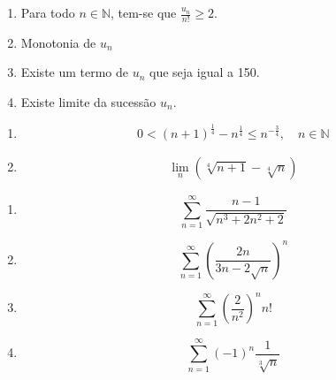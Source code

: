 \documentclass[11pt, a4paper]{article}
\begin{document}
\begin{enumerate}[label=\arabic{section}.\arabic*.]
	\item
		\begin{proposition}
			Para todo $n \in \mathbb{N}$, tem-se que $\frac{u_n}{n!}\geq 2$.
		\end{proposition}
	\item Monotonia de $u_n$
	\item
		\begin{proposition}
			Existe um termo de $u_n$ que seja igual a 150.
		\end{proposition}
	\item
		\begin{proposition}
			Existe limite da sucessão $u_n$.
		\end{proposition}
\end{enumerate}

\clearpage


\begin{enumerate}[label=\arabic{section}.\arabic*.]
	\item
		\begin{equation}
			0 < (n + 1)^\frac{1}{4}-n^\frac{1}{4}\leq n^{-\frac{3}{4}}, \quad
			n \in \mathbb{N}
		\end{equation}
	\item
		\begin{align*}
			\lim_{n} \left(\sqrt[4]{n + 1}-\sqrt[4]{n}\right)
		\end{align*}
\end{enumerate}


\begin{enumerate}[label=\arabic{section}.\arabic*.]
	\item
		\begin{equation}
			\sum_{n=1}^{\infty} \frac{n - 1}{\sqrt{n^3 + 2n^2 + 2}}
		\end{equation}
	\item
		\begin{equation}
			\sum_{n=1}^{\infty} \left(\frac{2n}{3n -2\sqrt{n}}\right)^n
		\end{equation}
	\item
		\begin{equation}
			\sum_{n=1}^{\infty} \left(\frac{2}{n^2}\right)^n n!
		\end{equation}
	\item
		\begin{equation}
			\sum_{n=1}^{\infty} (-1)^n \frac{1}{\sqrt[3]{n}}
		\end{equation}
\end{enumerate}
\end{document}

